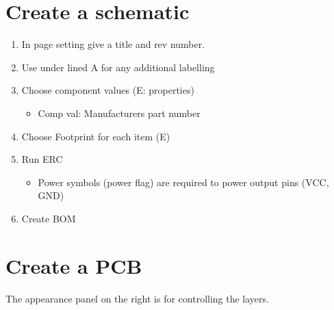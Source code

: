 \documentclass[11pt]{scrartcl} %
\begin{document}
\section{Create a schematic}

\begin{enumerate}
	\item In page setting give a title and rev number.
	\item Use under lined A for any additional labelling
	\item Choose component values (E: properties)
	\begin{itemize}
		\item Comp val: Manufacturers part number
	\end{itemize}
	\item Choose Footprint for each item (E)
	\item Run ERC
	\begin{itemize}
		\item Power symbols (power flag) are required to power output pins (VCC, GND)
	\end{itemize}
	\item Create BOM
\end{enumerate}

\section{Create a PCB}

The appearance panel on the right is for controlling the layers.
\end{document}
